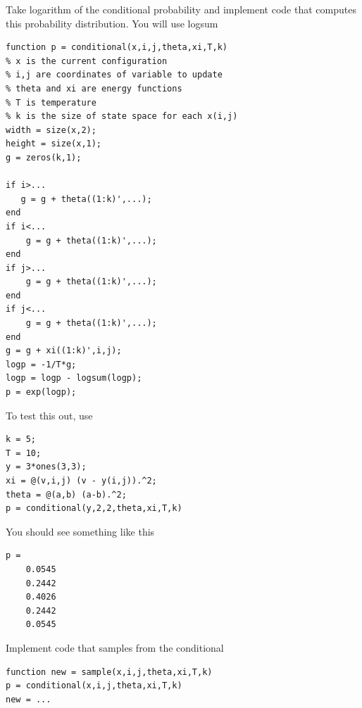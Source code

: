 \documentclass{article}
\begin{document}
\newproblem{2pt}
Take logarithm of the conditional probability and implement code that computes this probability distribution.
You will use logsum
\begin{verbatim}
function p = conditional(x,i,j,theta,xi,T,k)
% x is the current configuration
% i,j are coordinates of variable to update
% theta and xi are energy functions
% T is temperature
% k is the size of state space for each x(i,j)
width = size(x,2);
height = size(x,1);
g = zeros(k,1);

if i>...
   g = g + theta((1:k)',...);
end
if i<...
    g = g + theta((1:k)',...);
end
if j>...
    g = g + theta((1:k)',...);
end
if j<...
    g = g + theta((1:k)',...);
end
g = g + xi((1:k)',i,j);
logp = -1/T*g;
logp = logp - logsum(logp);
p = exp(logp);
\end{verbatim}
To test this out, use
\begin{verbatim}
k = 5;
T = 10;
y = 3*ones(3,3);
xi = @(v,i,j) (v - y(i,j)).^2;
theta = @(a,b) (a-b).^2;
p = conditional(y,2,2,theta,xi,T,k)
\end{verbatim}
You should see something like this
\begin{verbatim}
p =
    0.0545
    0.2442
    0.4026
    0.2442
    0.0545
\end{verbatim}
Implement code that samples from the conditional
\begin{verbatim}
function new = sample(x,i,j,theta,xi,T,k)
p = conditional(x,i,j,theta,xi,T,k)
new = ...
\end{verbatim}
\end{document}
